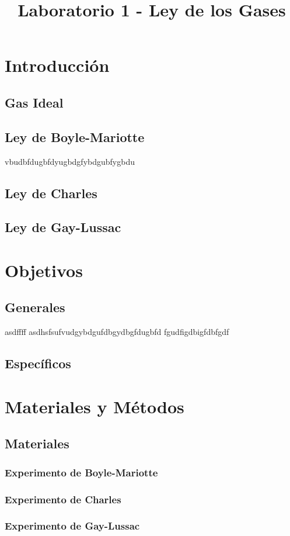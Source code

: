 \documentclass[11pt, letterpaper]{article}
\title{Laboratorio 1 - Ley de los Gases}
\begin{document}
\maketitle
\section{Introducción}
\subsection{Gas Ideal}
\subsection{Ley de Boyle-Mariotte}
vbudbfdugbfdyugbdgfybdgubfygbdu
\subsection{Ley de Charles}
\subsection{Ley de Gay-Lussac}
\section{Objetivos}
\subsection{Generales}
asdffff\cite{IFixit2016}
asdhsfsufvudgybdgufdbgydbgfdugbfd
fgudfigdbigfdbfgdf
\subsection{Específicos}
\section{Materiales y Métodos}
\subsection{Materiales}
\subsubsection{Experimento de Boyle-Mariotte}
\subsubsection{Experimento de Charles}
\subsubsection{Experimento de Gay-Lussac}
\end{document}
